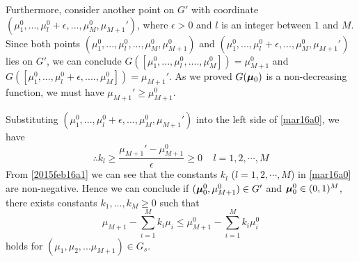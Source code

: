Furthermore,  consider another point on $G'$ with coordinate $(\mu_1^0, ..., \mu_l^0+\epsilon, ..., \mu_M^0, \mu_{M+1}')$, where $\epsilon > 0$ and $l$ is an integer between $1$ and $M$.  Since both points $(\mu_1^0, ..., \mu_l^0, ..., \mu_M^0, \mu_{M+1}^0)$ and $(\mu_1^0, ..., \mu_l^0+\epsilon, ..., \mu_M^0, \mu_{M+1}')$ lies on $G'$, we can conclude $G([\mu_1^0, ..., \mu_l^0, ...., \mu_M^0]) = \mu_{M+1}^0$ and $G([\mu_1^0, ..., \mu_l^0 + \epsilon, ...., \mu_M^0]) = \mu_{M+1}'$. As we proved $G(\boldsymbol{\mu}_0)$ is a non-decreasing function, we must have  $\mu_{M+1}' \geq \mu_{M+1}^0$.

Substituting $(\mu_1^0, ..., \mu_l^0+\epsilon, ..., \mu_M^0, \mu_{M+1}')$ into the left side of \eqref{mar16a0}, we have
\begin{equation}
\therefore k_l \geq \frac{\mu_{M+1}' - \mu_{M+1}^0}{\epsilon} \geq 0 \;\;\;\;l = 1, 2, \cdots, M
\label{2015feb16a1}
\end{equation}
From \eqref{2015feb16a1} we can see that the constants $k_l$ ($l = 1, 2, \cdots, M$) in \eqref{mar16a0} are non-negative.
 Hence we can conclude 
if  $(\boldsymbol{\mu}_0^0, \mu_{M+1}^0) \in G'$ and $\boldsymbol{\mu}_0^0 \in (0, 1)^M$, there exists constants $k_1, ..., k_M \geq 0 $ such that  
\begin{equation}
\mu_{M+1} - \sum_{i=1}^{M}k_i\mu_i \leq \mu_{M+1}^0 - \sum_{i=1}^{M}k_i\mu_i^0
\label{PPI32015b}
\end{equation}
holds for  $(\mu_1, \mu_2, ...\mu_{M+1}) \in G_s$. 

